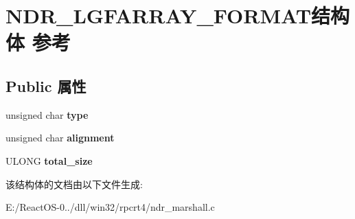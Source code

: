 \hypertarget{struct_n_d_r___l_g_f_a_r_r_a_y___f_o_r_m_a_t}{}\section{N\+D\+R\+\_\+\+L\+G\+F\+A\+R\+R\+A\+Y\+\_\+\+F\+O\+R\+M\+A\+T结构体 参考}
\label{struct_n_d_r___l_g_f_a_r_r_a_y___f_o_r_m_a_t}
\subsection*{Public 属性}
\begin{DoxyCompactItemize}
\item 
\mbox{\label{struct_n_d_r___l_g_f_a_r_r_a_y___f_o_r_m_a_t_a914f4fa55899e9b84c892e90c968b165}} 
unsigned char {\bfseries type}
\item 
\mbox{\label{struct_n_d_r___l_g_f_a_r_r_a_y___f_o_r_m_a_t_a1397ddf61ad905d89bf19dd42306f9e3}} 
unsigned char {\bfseries alignment}
\item 
\mbox{\label{struct_n_d_r___l_g_f_a_r_r_a_y___f_o_r_m_a_t_aaf472790afc5b11b9a74f43cc05ce1c9}} 
U\+L\+O\+NG {\bfseries total\+\_\+size}
\end{DoxyCompactItemize}


该结构体的文档由以下文件生成\+:\begin{DoxyCompactItemize}
\item 
E\+:/\+React\+O\+S-\/0../dll/win32/rpcrt4/ndr\+\_\+marshall.\+c\end{DoxyCompactItemize}
